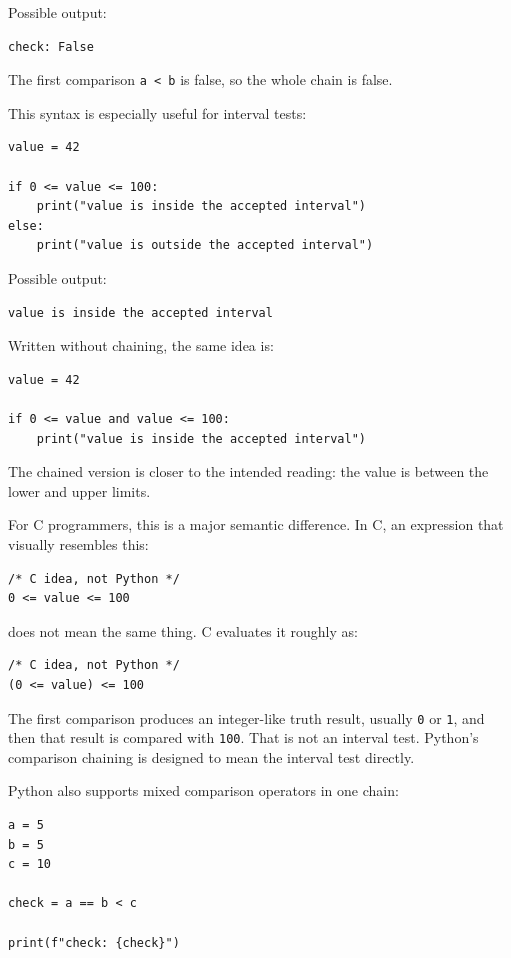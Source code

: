 \documentclass[a4paper,twoside]{report}
\begin{document}
Possible output:

\begin{verbatim}
check: False
\end{verbatim}

The first comparison \texttt{a < b} is false, so the whole chain is false.

This syntax is especially useful for interval tests:

\begin{verbatim}
value = 42

if 0 <= value <= 100:
    print("value is inside the accepted interval")
else:
    print("value is outside the accepted interval")
\end{verbatim}

Possible output:

\begin{verbatim}
value is inside the accepted interval
\end{verbatim}

Written without chaining, the same idea is:

\begin{verbatim}
value = 42

if 0 <= value and value <= 100:
    print("value is inside the accepted interval")
\end{verbatim}

The chained version is closer to the intended reading: the value is between the lower and upper limits.

For C programmers, this is a major semantic difference. In C, an expression that visually resembles this:

\begin{verbatim}
/* C idea, not Python */
0 <= value <= 100
\end{verbatim}

does not mean the same thing. C evaluates it roughly as:

\begin{verbatim}
/* C idea, not Python */
(0 <= value) <= 100
\end{verbatim}

The first comparison produces an integer-like truth result, usually \texttt{0} or \texttt{1}, and then that result is compared with \texttt{100}. That is not an interval test. Python's comparison chaining is designed to mean the interval test directly.

Python also supports mixed comparison operators in one chain:

\begin{verbatim}
a = 5
b = 5
c = 10

check = a == b < c

print(f"check: {check}")
\end{verbatim}
\end{document}
